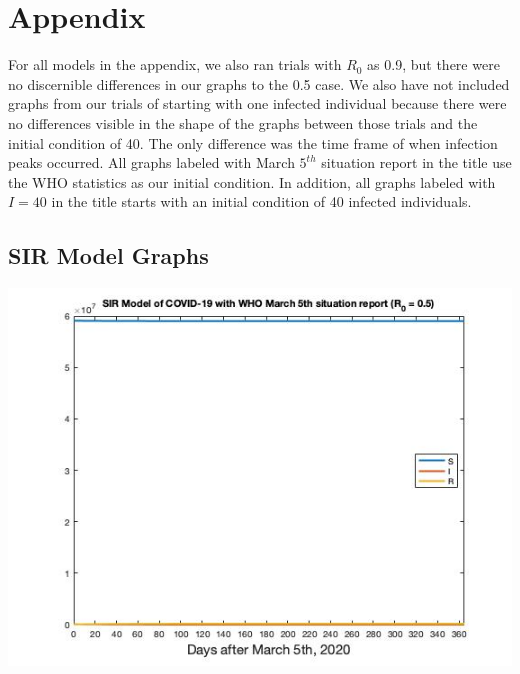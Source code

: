 \documentclass[12pt, a4paper]{article}
\begin{document}
    \newpage
    
    \section{Appendix}
    
    For all models in the appendix, we also ran trials with $R_0$ as 0.9, but there were no discernible differences in our graphs to the 0.5 case. We also have not included graphs from our trials of starting with one infected individual because there were no differences visible in the shape of the graphs between those trials and the initial condition of 40. The only difference was the time frame of when infection peaks occurred. All graphs labeled with March $5^{th}$ situation report in the title use the WHO statistics as our initial condition. In addition, all graphs labeled with $I=40$ in the title starts with an initial condition of 40 infected individuals.

    \subsection{SIR Model Graphs}
    
    
        
        
        
   
   \includegraphics[scale=0.75]{plots/whosir5.jpg}
   
\end{document}
